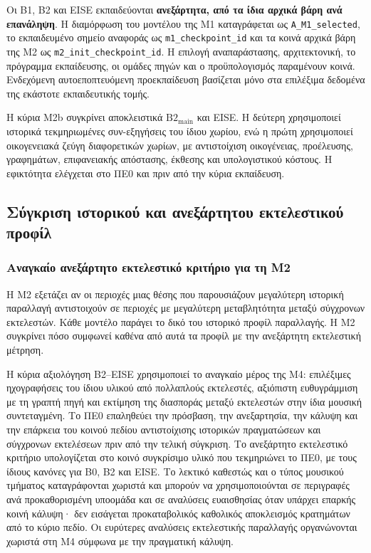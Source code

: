 \documentclass[11pt,a4paper]{article}
\begin{document}
Οι B1, B2 και EISE εκπαιδεύονται \textbf{ανεξάρτητα, από τα ίδια αρχικά βάρη ανά επανάληψη}. Η διαμόρφωση του μοντέλου της Μ1 καταγράφεται ως \texttt{A\_M1\_selected}, το εκπαιδευμένο σημείο αναφοράς ως \texttt{m1\_checkpoint\_id} και τα κοινά αρχικά βάρη της Μ2 ως \texttt{m2\_init\_checkpoint\_id}. Η επιλογή αναπαράστασης, αρχιτεκτονική, το πρόγραμμα εκπαίδευσης, οι ομάδες πηγών και ο προϋπολογισμός παραμένουν κοινά. Ενδεχόμενη αυτοεποπτευόμενη προεκπαίδευση βασίζεται μόνο στα επιλέξιμα δεδομένα της εκάστοτε εκπαιδευτικής τομής.

Η κύρια Μ2b συγκρίνει αποκλειστικά $\mathrm{B2}_{\mathrm{main}}$ και EISE. Η δεύτερη χρησιμοποιεί ιστορικά τεκμηριωμένες συν-εξηγήσεις του ίδιου χωρίου, ενώ η πρώτη χρησιμοποιεί οικογενειακά ζεύγη διαφορετικών χωρίων, με αντιστοίχιση οικογένειας, προέλευσης, γραφημάτων, επιφανειακής απόστασης, έκθεσης και υπολογιστικού κόστους. Η εφικτότητα ελέγχεται στο ΠΕ0 και πριν από την κύρια εκπαίδευση.

\subsection{Σύγκριση ιστορικού και ανεξάρτητου εκτελεστικού προφίλ}\label{sec:eise-transfer}

\subsubsection{Αναγκαίο ανεξάρτητο εκτελεστικό κριτήριο για τη M2}\label{sec:m4-min}

Η M2 εξετάζει αν οι περιοχές μιας θέσης που παρουσιάζουν μεγαλύτερη ιστορική παραλλαγή αντιστοιχούν σε περιοχές με μεγαλύτερη μεταβλητότητα μεταξύ σύγχρονων εκτελεστών. Κάθε μοντέλο παράγει το δικό του ιστορικό προφίλ παραλλαγής. Η M2 συγκρίνει πόσο συμφωνεί καθένα από αυτά τα προφίλ με την ανεξάρτητη εκτελεστική μέτρηση.

Η κύρια αξιολόγηση B2--EISE χρησιμοποιεί το αναγκαίο μέρος της M4: επιλέξιμες ηχογραφήσεις του ίδιου υλικού από πολλαπλούς εκτελεστές, αξιόπιστη ευθυγράμμιση με τη γραπτή πηγή και εκτίμηση της διασποράς μεταξύ εκτελεστών στην ίδια μουσική συντεταγμένη. Το ΠΕ0 επαληθεύει την πρόσβαση, την ανεξαρτησία, την κάλυψη και την επάρκεια του κοινού πεδίου αντιστοίχισης ιστορικών πραγματώσεων και σύγχρονων εκτελέσεων πριν από την τελική σύγκριση. Το ανεξάρτητο εκτελεστικό κριτήριο υπολογίζεται στο κοινό συγκρίσιμο υλικό που τεκμηριώνει το ΠΕ0, με τους ίδιους κανόνες για B0, B2 και EISE. Το λεκτικό καθεστώς και ο τύπος μουσικού τμήματος καταγράφονται χωριστά και μπορούν να χρησιμοποιούνται σε περιγραφές ανά προκαθορισμένη υποομάδα και σε αναλύσεις ευαισθησίας όταν υπάρχει επαρκής κοινή κάλυψη· δεν εισάγεται προκαταβολικός καθολικός αποκλεισμός κρατημάτων από το κύριο πεδίο. Οι ευρύτερες αναλύσεις εκτελεστικής παραλλαγής οργανώνονται χωριστά στη M4 σύμφωνα με την πραγματική κάλυψη.
\end{document}
